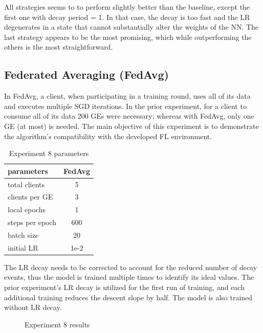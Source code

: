 All strategies seems to to perform slightly better than the baseline, except the first one with decay period = 1. In that case, the decay is too fast and the LR degenerates in a state that cannot substantially alter the weights of the NN. The last strategy appears to be the most promising, which while outperforming the others is the most straightforward.

\subsection{Federated Averaging (FedAvg)}
In FedAvg, a client, when participating in a training round, uses all of its data and executes multiple SGD iterations. In the prior experiment, for a client to consume all of its data 200 GEs were necessary; whereas with FedAvg, only one GE (at most) is needed. The main objective of this experiment is to demonstrate the algorithm's compatibility with the developed FL environment.

\begin{table}[H]
    \center
    \begin{tabular}
        { | l | c | }
        \hline
        parameters & FedAvg\\\hline
        total clients   & 5\\\hline
        clients per GE  & 3\\\hline
        local epochs    & 1\\\hline
        steps per epoch & 600\\\hline
        batch size      & 20\\\hline
        initial LR      &  1e-2\\\hline
    \end{tabular}
    \caption[Experiment 8 parameters]{Experiment 8 parameters}
    \label{table:Experiment 8 parameters}
\end{table}

The LR decay needs to be corrected to account for the reduced number of decay events, thus the model is trained multiple times to identify its ideal values. The prior experiment's LR decay is utilized for the first run of training, and each additional training reduces the descent slope by half. The model is also trained without LR decay.
    
\begin{figure}[H]
    \center
    
    \caption[Experiment 8 results]{Experiment 8 results}
    \label{fig:Experiment 8 results}
\end{figure}

